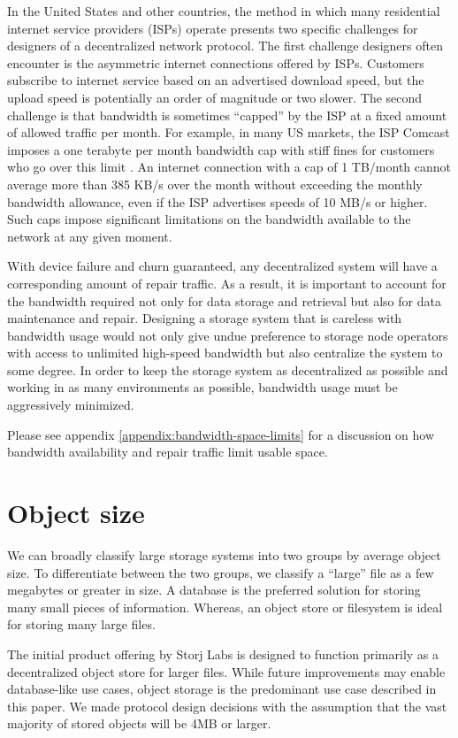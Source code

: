 \documentclass[11pt,fleqn,openany]{book}
\begin{document}
In the United States and other countries,
the method in which many residential internet service providers (ISPs)
operate presents two specific challenges for designers of a
decentralized network protocol. The first challenge designers often encounter is
the asymmetric internet connections offered by ISPs.
Customers subscribe to internet service
based on an advertised download speed, but the upload speed is potentially an
order of magnitude or two slower. The second challenge is that bandwidth is
sometimes ``capped'' by the ISP at a fixed amount of allowed traffic per month.
For example, in many
US markets, the ISP Comcast imposes a one terabyte per month bandwidth cap
with stiff fines for customers who go over this limit \cite{comcast-cap}.
An internet connection with a cap of 1 TB/month cannot average more than
385 KB/s over the month without exceeding the monthly bandwidth allowance,
even if the ISP advertises speeds of 10 MB/s or higher.
Such caps impose
significant limitations on the bandwidth available to the network
at any given moment.

With device failure and churn guaranteed, any decentralized system will have a
corresponding amount of repair traffic. As a result, it is important to account
for the bandwidth required not only for data storage and retrieval but also
for data maintenance and repair. Designing a
storage system that is careless with bandwidth usage would not only give undue
preference to storage node operators with access to unlimited high-speed
bandwidth but also centralize the system to some degree. In order to keep the storage
system as decentralized as possible and working in as many environments
as possible, bandwidth usage must be aggressively minimized.

Please see appendix \ref{appendix:bandwidth-space-limits} for a discussion on how
bandwidth availability and repair traffic limit usable space.

\section{Object size}

We can broadly classify large storage systems into two groups by average
object size. To differentiate between the two groups, we classify a ``large'' file as a
few megabytes or greater in size. A database is the preferred solution for storing many small pieces of information. Whereas, an object store or filesystem is ideal for storing many large files.

The initial product offering by Storj Labs is designed to function primarily as
a decentralized object store for larger files.
While future improvements may enable
database-like use cases, object storage is the predominant use case described in
this paper. We made protocol design decisions with the assumption that the
vast majority of stored objects will be 4MB or larger.
\end{document}
